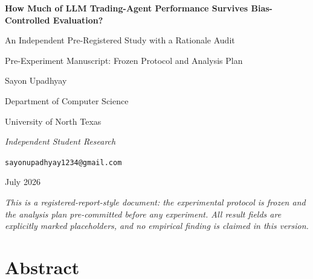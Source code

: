 \documentclass[
  12pt,
]{article}
\author{}
\date{}
\begin{document}
\begin{titlepage}
\centering
\vspace*{2cm}
{\LARGE\bfseries How Much of LLM Trading-Agent Performance Survives Bias-Controlled Evaluation?\par}
\vspace{0.6em}
{\Large An Independent Pre-Registered Study with a Rationale Audit\par}
\vspace{1.2em}
{\large Pre-Experiment Manuscript: Frozen Protocol and Analysis Plan\par}
\vspace{3em}
{\large Sayon Upadhyay\par}
\vspace{0.3em}
Department of Computer Science\par
University of North Texas\par
\textit{Independent Student Research}\par
\texttt{sayonupadhyay1234@gmail.com}\par
\vspace{1.5em}
July 2026\par
\vfill
\begin{minipage}{0.85\textwidth}
\small\itshape This is a registered-report-style document: the experimental
protocol is frozen and the analysis plan pre-committed before any experiment.
All result fields are explicitly marked placeholders, and no empirical finding
is claimed in this version.
\end{minipage}
\vspace*{1.5cm}
\end{titlepage}

\tableofcontents
\clearpage
\listoffigures
\vspace{3em}
\listoftables
\newpage

\hypertarget{abstract}{%
\section{Abstract}\label{abstract}}
\end{document}
